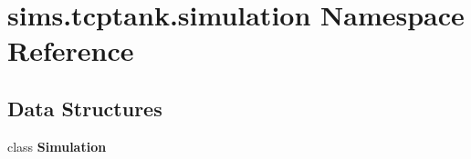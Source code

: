 \section{sims.\+tcptank.\+simulation Namespace Reference}
\label{namespacesims_1_1tcptank_1_1simulation}
\subsection*{Data Structures}
\begin{DoxyCompactItemize}
\item 
class {\bf Simulation}
\end{DoxyCompactItemize}
